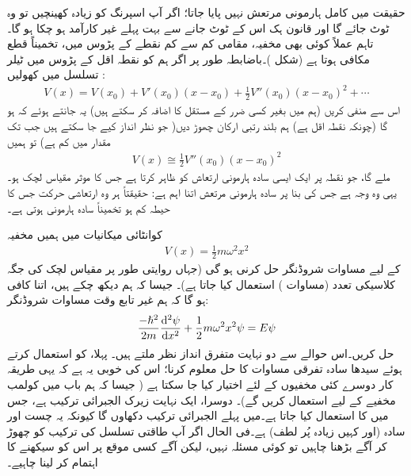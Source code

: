 حقیقت میں کامل ہارمونی مرتعش نہیں پایا جاتا؛ اگر آپ اسپرنگ کو زیادہ کھینچیں تو وہ ٹوٹ جائے گا اور قانون ہک اس کے ٹوٹ جانے سے  بہت پہلے غیر کارآمد ہو چکا ہو گا۔ تاہم عملاً کوئی بھی مخفیہ، مقامی کم سے کم نقطے  کے پڑوس میں،  تخمیناً قطع مکافی  ہوتا ہے  (شکل )۔باضابطہ طور پر اگر ہم  کو نقطہ اقل کے پڑوس میں ٹیلر تسلسل میں کھولیں :
\begin{align*}
V(x)=V( x_{0})+V'(x_{0})(x-x_{0})+\frac{1}{2}V''(x_{0})(x-x_{0})^{2}+\cdots
\end{align*}
اس سے  منفی کریں (ہم  میں بغیر کسی ضرر کے مستقل کا اضافہ کر سکتے ہیں)  یہ جانتے ہوئے کہ    ہو گا (چونکہ  نقطہ اقل ہے)  ہم  بلند   رتبی  ارکان چھوڑ دیں(  جو نظر انداز کیے جا سکتے ہیں جب تک  مقدار میں کم ہے) تو ہمیں
\begin{align*}
V(x)\cong\frac{1}{2}V''(x_{0})(x-x_{0})^{2}
\end{align*} 
ملے گا، جو نقطہ  پر ایک ایسی سادہ ہارمونی ارتعاش  کو ظاہر  کرتا ہے جس کا موثر مقیاس لچک  ہو۔ یہی وہ وجہ ہے جس کی بنا پر سادہ ہارمونی مرتعش اتنا اہم ہے: حقیقتاً  ہر وہ ارتعاشی حرکت جس کا حیطہ کم ہو تخمیناً سادہ ہارمونی ہوتی ہے۔

کوانٹائی میکانیات میں ہمیں مخفیہ
\begin{align}\label{مساوات_شروڈنگر_مخفیہ_ہارمونی}
V(x)=\frac{1}{2}m\omega ^{2}x^{2}
\end{align}
کے لیے مساوات شروڈنگر حل کرنی ہو گی (جہاں روایتی طور پر مقیاس لچک کی جگہ کلاسیکی تعدد (مساوات ) استعمال کیا جاتا ہے)۔ جیسا کہ ہم دیکھ چکے ہیں، اتنا کافی ہو گا کہ ہم غیر تابع وقت مساوات شروڈنگر:
\begin{align}\label{مساوات_شروڈنگر_مخفی_قوہ_الف}
\frac{-\hslash ^{2}}{2m}\frac{\dif{^{2}\psi}}{\dif{x^{2}}}+\frac{1}{2}m\omega ^{2}x^{2}\psi=E\psi
\end{align}
حل کریں۔اس حوالے سے دو نہایت متفرق انداز نظر ملتے ہیں۔ پہلا،    کو استعمال کرتے ہوئے     سیدھا سادہ  تفرقی مساوات کا حل معلوم کرنا؛  اس کی خوبی یہ ہے کہ یہی طریقہ کار دوسرے کئی مخفیوں کے لئے اختیار کیا جا سکتا ہے  ( جیسا کہ ہم باب  میں کولمب مخفیے کے لیے استعمال کریں گے)۔ دوسرا،  ایک نہایت زیرک    الجبرائی ترکیب  ہے، جس میں  کا  استعمال  کیا جاتا ہے۔میں پہلے الجبرائی ترکیب دکھاوں گا کیونکہ  یہ چست اور سادہ  (اور کہیں زیادہ پُر لطف) ہے۔فی الحال اگر آپ  طاقتی تسلسل  کی ترکیب کو چھوڑ کر آگے بڑھنا چاہیں تو کوئی مسئلہ نہیں، لیکن آگے کسی موقع پر اس کو سیکھنے کا اہتمام کر لینا چاہیے۔   

